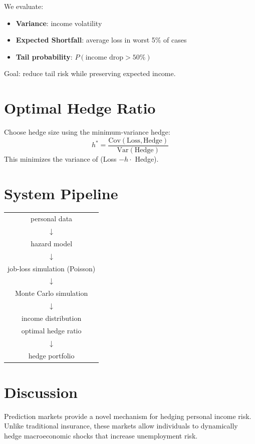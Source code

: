 \documentclass[11pt]{article}
\begin{document}
We evaluate:

\begin{itemize}
\item \textbf{Variance}: income volatility
\item \textbf{Expected Shortfall}: average loss in worst 5\% of cases
\item \textbf{Tail probability}: $P(\text{income drop} > 50\%)$
\end{itemize}

Goal: reduce tail risk while preserving expected income.

\section{Optimal Hedge Ratio}

Choose hedge size using the minimum-variance hedge:
\[
h^* = \frac{\text{Cov}(\text{Loss}, \text{Hedge})}{\text{Var}(\text{Hedge})}
\]
This minimizes the variance of (Loss $- h \cdot$ Hedge).

\section{System Pipeline}

\begin{center}
\begin{tabular}{c}
personal data \\
$\downarrow$ \\
hazard model \\
$\downarrow$ \\
job-loss simulation (Poisson) \\
$\downarrow$ \\
Monte Carlo simulation \\
$\downarrow$ \\
income distribution \\
optimal hedge ratio \\
$\downarrow$ \\
hedge portfolio
\end{tabular}
\end{center}

\section{Discussion}

Prediction markets provide a novel mechanism for hedging personal income risk. 
Unlike traditional insurance, these markets allow individuals to dynamically 
hedge macroeconomic shocks that increase unemployment risk.
\end{document}
